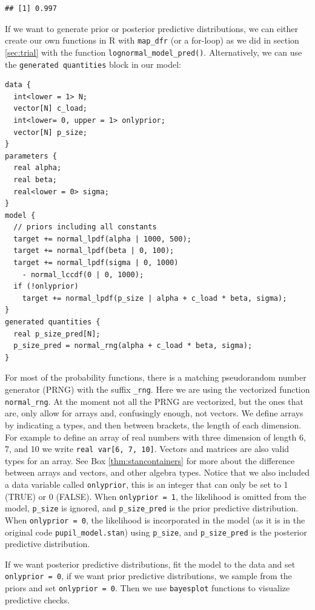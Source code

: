 \documentclass[12pt,]{krantz}
\theoremstyle{definition}
\theoremstyle{definition}
\theoremstyle{definition}
\theoremstyle{remark}
\begin{document}
\begin{verbatim}
## [1] 0.997
\end{verbatim}

If we want to generate prior or posterior predictive distributions, we
can either create our own functions in R with \texttt{map\_dfr} (or a
for-loop) as we did in section \ref{sec:trial} with the function
\texttt{lognormal\_model\_pred()}. Alternatively, we can use the
\texttt{generated\ quantities} block in our model:

\begin{verbatim}
data {
  int<lower = 1> N;
  vector[N] c_load;
  int<lower= 0, upper = 1> onlyprior;
  vector[N] p_size;
}
parameters {
  real alpha;
  real beta;
  real<lower = 0> sigma;
}
model {
  // priors including all constants
  target += normal_lpdf(alpha | 1000, 500);
  target += normal_lpdf(beta | 0, 100);
  target += normal_lpdf(sigma | 0, 1000)
    - normal_lccdf(0 | 0, 1000);
  if (!onlyprior)
    target += normal_lpdf(p_size | alpha + c_load * beta, sigma);
}
generated quantities {
  real p_size_pred[N];
  p_size_pred = normal_rng(alpha + c_load * beta, sigma);
}
\end{verbatim}

For most of the probability functions, there is a matching pseudorandom
number generator (PRNG) with the suffix \texttt{\_rng}. Here we are
using the vectorized function \texttt{normal\_rng}. At the moment not
all the PRNG are vectorized, but the ones that are, only allow for
arrays and, confusingly enough, not vectors. We define arrays by
indicating a types, and then between brackets, the length of each
dimension. For example to define an array of real numbers with three
dimension of length 6, 7, and 10 we write
\texttt{real\ var{[}6,\ 7,\ 10{]}}. Vectors and matrices are also valid
types for an array. See Box \ref{thm:stancontainers} for more about the
difference between arrays and vectors, and other algebra types. Notice
that we also included a data variable called \texttt{onlyprior}, this is
an integer that can only be set to 1 (TRUE) or 0 (FALSE). When
\texttt{onlyprior\ =\ 1}, the likelihood is omitted from the model,
\texttt{p\_size} is ignored, and \texttt{p\_size\_pred} is the prior
predictive distribution. When \texttt{onlyprior\ =\ 0}, the likelihood
is incorporated in the model (as it is in the original code
\texttt{pupil\_model.stan}) using \texttt{p\_size}, and
\texttt{p\_size\_pred} is the posterior predictive distribution.

If we want posterior predictive distributions, fit the model to the data
and set \texttt{onlyprior\ =\ 0}, if we want prior predictive
distributions, we sample from the priors and set
\texttt{onlyprior\ =\ 0}. Then we use \texttt{bayesplot} functions to
visualize predictive checks.
\end{document}
